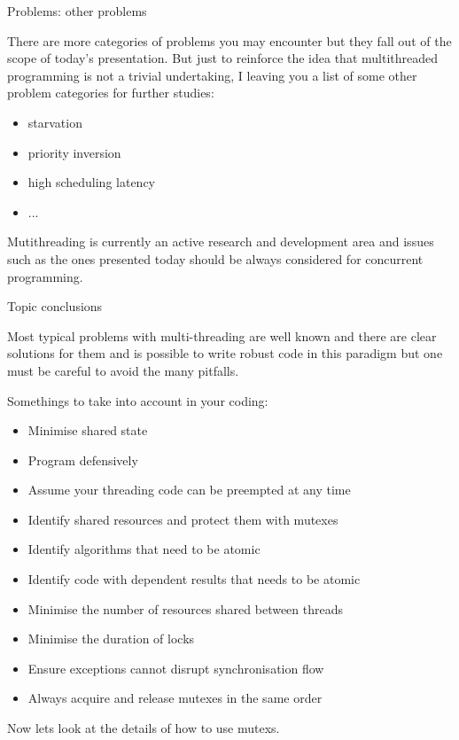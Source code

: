 \documentclass[8pt]{beamer}
\begin{document}
\begin{frame}{Problems: other problems}
 
There are more categories of problems you may encounter but they fall out of the scope of today's presentation. But just to reinforce the idea that multithreaded programming is not a trivial undertaking, 
I leaving you a list of some other problem categories for further studies:

\begin{itemize}
  \item starvation
  \item priority inversion
  \item high scheduling latency
  \item ...
\end{itemize}

Mutithreading is currently an active research and development area and issues such as the ones presented today should be always considered for concurrent programming. 
 
\end{frame}

\begin{frame}{Topic conclusions}

Most typical problems with multi-threading are well known and there are clear solutions for them and is possible to write robust code in this paradigm but one must be careful to avoid the many pitfalls. 

\begin{block}{Somethings to take into account in your coding:}
 
\begin{itemize}
  \item Minimise shared state
  \item Program defensively
  \item Assume your threading code can be preempted at any time
  \item Identify shared resources and protect them with mutexes
  \item Identify algorithms that need to be atomic
  \item Identify code with dependent results that needs to be atomic
  \item Minimise the number of resources shared between threads
  \item Minimise the duration of locks
  \item Ensure exceptions cannot disrupt synchronisation flow
  \item Always acquire and release mutexes in the same order
\end{itemize}

\end{block}

\begin{center} 
Now lets look at the details of how to use mutexs.
\end{center}

\end{frame}
\end{document}
